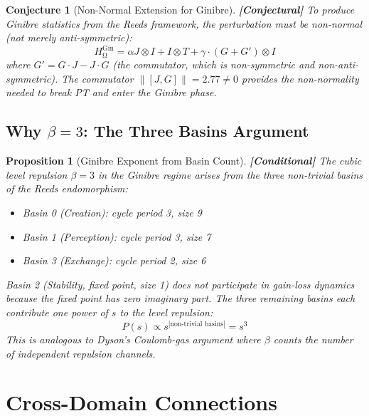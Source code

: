 \documentclass[12pt,a4paper]{article}
\newcommand{\conditional}[1]{\textcolor{conditional}{\textbf{[Conditional]}} #1}
\newcommand{\conjectural}[1]{\textcolor{conjectural}{\textbf{[Conjectural]}} #1}
\newtheorem{proposition}[theorem]{Proposition}
\newtheorem{conjecture}[theorem]{Conjecture}
\theoremstyle{definition}
\theoremstyle{remark}
\renewcommand{\O}{\mathrm{\Omega}}
\newcommand{\Jcoup}{J}
\newcommand{\HOmega}{H_\O}
\newcommand{\Gin}{\mathrm{Gin}}
\begin{document}
\begin{conjecture}[Non-Normal Extension for Ginibre]
\label{conj:nonnormal}
\conjectural{To produce Ginibre statistics from the Reeds framework, the
perturbation must be \emph{non-normal} (not merely anti-symmetric):}
\begin{equation}
  \HOmega^{\Gin} = \alpha \Jcoup \otimes I + I \otimes T + \gamma \cdot (G + G') \otimes I
\end{equation}
where $G' = G \cdot \Jcoup - \Jcoup \cdot G$ (the commutator, which is
non-symmetric and non-anti-symmetric). The commutator $\|[J, G]\| = 2.77 \neq 0$
provides the non-normality needed to break PT and enter the Ginibre phase.
\end{conjecture}

\subsection{Why $\beta = 3$: The Three Basins Argument}

\begin{proposition}[Ginibre Exponent from Basin Count]
\label{prop:beta3}
\conditional{The cubic level repulsion $\beta = 3$ in the Ginibre regime arises
from the three non-trivial basins of the Reeds endomorphism:}
\begin{itemize}
  \item Basin 0 (Creation): cycle period 3, size 9
  \item Basin 1 (Perception): cycle period 3, size 7
  \item Basin 3 (Exchange): cycle period 2, size 6
\end{itemize}
Basin 2 (Stability, fixed point, size 1) does not participate in gain-loss
dynamics because the fixed point has zero imaginary part. The three remaining
basins each contribute one power of $s$ to the level repulsion:
\begin{equation}
  P(s) \propto s^{|\text{non-trivial basins}|} = s^3
\end{equation}
This is analogous to Dyson's Coulomb-gas argument \cite{dyson1962} where
$\beta$ counts the number of independent repulsion channels.
\end{proposition}

\section{Cross-Domain Connections}
\label{sec:cross}
\end{document}
